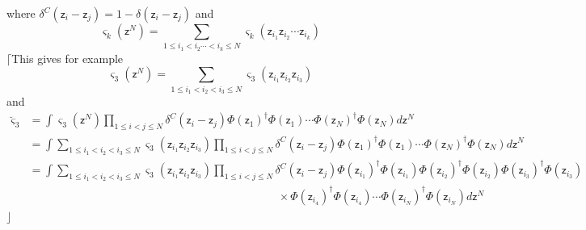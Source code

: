 \documentclass[aps,preprint]{revtex4}%
\begin{document}
where $\delta^{C}\left(  \mathsf{z}_{i}-\mathsf{z}_{j}\right)  =1-\delta
\left(  \mathsf{z}_{i}-\mathsf{z}_{j}\right)  $ and
\begin{equation}
\varsigma_{k}\left(  \mathsf{z}^{N}\right)  =\sum_{1\leq i_{1}<i_{2}%
\cdots<i_{k}\leq N}\varsigma_{k}\left(  \mathsf{z}_{i_{1}}\mathsf{z}_{i_{2}%
}\cdots\mathsf{z}_{i_{k}}\right)
\end{equation}
$\lceil$This gives for example
\begin{equation}
\varsigma_{3}\left(  \mathsf{z}^{N}\right)  =\sum_{1\leq i_{1}<i_{2}<i_{3}\leq
N}\varsigma_{3}\left(  \mathsf{z}_{i_{1}}\mathsf{z}_{i_{2}}\mathsf{z}_{i_{3}%
}\right)
\end{equation}
and
\begin{align}
\breve{\varsigma}_{3} &  =\int\varsigma_{3}\left(  \mathsf{z}^{N}\right)
\prod_{1\leq i<j\leq N}\delta^{C}\left(  \mathsf{z}_{i}-\mathsf{z}_{j}\right)
\Phi\left(  \mathsf{z}_{1}\right)  ^{\dagger}\Phi\left(  \mathsf{z}%
_{1}\right)  \cdots\Phi\left(  \mathsf{z}_{N}\right)  ^{\dagger}\Phi\left(
\mathsf{z}_{N}\right)  d\mathsf{z}^{N}\nonumber\\
&  =\int\sum_{1\leq i_{1}<i_{2}<i_{3}\leq N}\varsigma_{3}\left(
\mathsf{z}_{i_{1}}\mathsf{z}_{i_{2}}\mathsf{z}_{i_{3}}\right)  \prod_{1\leq
i<j\leq N}\delta^{C}\left(  \mathsf{z}_{i}-\mathsf{z}_{j}\right)  \Phi\left(
\mathsf{z}_{1}\right)  ^{\dagger}\Phi\left(  \mathsf{z}_{1}\right)  \cdots
\Phi\left(  \mathsf{z}_{N}\right)  ^{\dagger}\Phi\left(  \mathsf{z}%
_{N}\right)  d\mathsf{z}^{N}\nonumber\\
&  =\int\sum_{1\leq i_{1}<i_{2}<i_{3}\leq N}\varsigma_{3}\left(
\mathsf{z}_{i_{1}}\mathsf{z}_{i_{2}}\mathsf{z}_{i_{3}}\right)  \prod_{1\leq
i<j\leq N}\delta^{C}\left(  \mathsf{z}_{i}-\mathsf{z}_{j}\right)  \Phi\left(
\mathsf{z}_{i_{1}}\right)  ^{\dagger}\Phi\left(  \mathsf{z}_{i_{1}}\right)
\Phi\left(  \mathsf{z}_{i_{2}}\right)  ^{\dagger}\Phi\left(  \mathsf{z}%
_{i_{2}}\right)  \Phi\left(  \mathsf{z}_{i_{3}}\right)  ^{\dagger}\Phi\left(
\mathsf{z}_{i_{3}}\right)  \nonumber\\
&  \qquad\qquad\qquad\qquad\qquad\qquad\qquad\qquad\qquad\qquad\qquad
\times\Phi\left(  \mathsf{z}_{i_{4}}\right)  ^{\dagger}\Phi\left(
\mathsf{z}_{i_{4}}\right)  \cdots\Phi\left(  \mathsf{z}_{i_{N}}\right)
^{\dagger}\Phi\left(  \mathsf{z}_{i_{N}}\right)  d\mathsf{z}^{N}%
\end{align}
$\rfloor$
\end{document}
